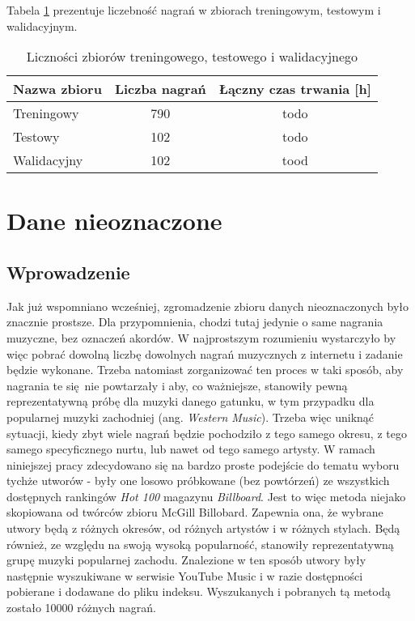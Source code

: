 Tabela \ref{tab:datasets3} prezentuje liczebność nagrań w zbiorach treningowym, testowym i
walidacyjnym.

\begin{table}
    \centering
    \caption{Liczności zbiorów treningowego, testowego i walidacyjnego}
    \label{tab:datasets3}
    \begin{tabular}{|l|c|c|}
        \hline
        Nazwa zbioru & Liczba nagrań & Łączny czas trwania [h] \\
        \hline
        Treningowy  & 790 & todo \\
        Testowy     & 102 & todo \\
        Walidacyjny & 102 & tood \\
        \hline
    \end{tabular}
\end{table}


\section{Dane nieoznaczone}

\subsection{Wprowadzenie}

Jak już wspomniano wcześniej, zgromadzenie zbioru danych nieoznaczonych było znacznie prostsze. Dla
przypomnienia, chodzi tutaj jedynie o same nagrania muzyczne, bez oznaczeń akordów. W najprostszym
rozumieniu wystarczyło by więc pobrać dowolną liczbę dowolnych nagrań muzycznych z internetu i
zadanie będzie wykonane. Trzeba natomiast zorganizować ten proces w taki sposób, aby nagrania te
się nie powtarzały i aby, co ważniejsze, stanowiły pewną reprezentatywną próbę dla muzyki danego
gatunku, w tym przypadku dla popularnej muzyki zachodniej (ang. \emph{Western Music}). Trzeba więc
uniknąć sytuacji, kiedy zbyt wiele nagrań będzie pochodziło z tego samego okresu, z tego samego
specyficznego nurtu, lub nawet od tego samego artysty. W ramach niniejszej pracy zdecydowano się na
bardzo proste podejście do tematu wyboru tychże utworów - były one losowo próbkowane (bez powtórzeń)
ze wszystkich dostępnych rankingów \emph{Hot 100} magazynu \emph{Billboard}. Jest to więc metoda
niejako skopiowana od twórców zbioru McGill Billobard. Zapewnia ona, że wybrane utwory będą z
różnych okresów, od różnych artystów i w różnych stylach. Będą również, ze względu na swoją wysoką
popularność, stanowiły reprezentatywną grupę muzyki popularnej zachodu. Znalezione w ten sposób
utwory były następnie wyszukiwane w serwisie YouTube Music i w razie dostępności pobierane i
dodawane do pliku indeksu. Wyszukanych i pobranych tą metodą zostało 10000 różnych nagrań.

